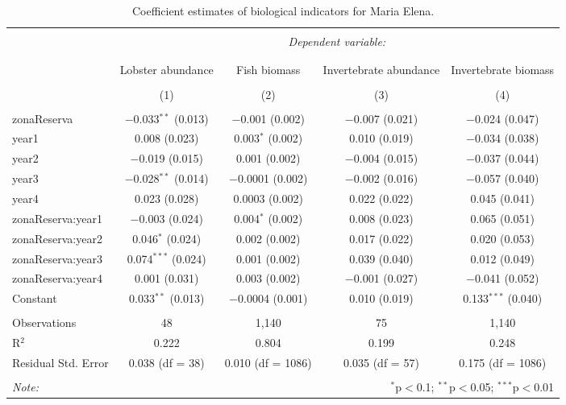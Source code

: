 \documentclass[utf8]{frontiers_suppmat} %
\theoremstyle{definition}
\theoremstyle{definition}
\theoremstyle{definition}
\theoremstyle{remark}
\begin{document}
\begin{table}[!htbp] \centering 
  \caption{Coefficient estimates of biological indicators for Maria Elena.} 
  \label{} 
\tiny 
\begin{tabular}{@{\extracolsep{1pt}}lcccc} 
\\[-1.8ex]\hline 
\hline \\[-1.8ex] 
 & \multicolumn{4}{c}{\textit{Dependent variable:}} \\ 
\cline{2-5} 
\\[-1.8ex] & \multicolumn{4}{c}{} \\ 
 & Lobster abundance & Fish biomass & Invertebrate abundance & Invertebrate biomass \\ 
\\[-1.8ex] & (1) & (2) & (3) & (4)\\ 
\hline \\[-1.8ex] 
 zonaReserva & $-$0.033$^{**}$ (0.013) & $-$0.001 (0.002) & $-$0.007 (0.021) & $-$0.024 (0.047) \\ 
  year1 & 0.008 (0.023) & 0.003$^{*}$ (0.002) & 0.010 (0.019) & $-$0.034 (0.038) \\ 
  year2 & $-$0.019 (0.015) & 0.001 (0.002) & $-$0.004 (0.015) & $-$0.037 (0.044) \\ 
  year3 & $-$0.028$^{**}$ (0.014) & $-$0.0001 (0.002) & $-$0.002 (0.016) & $-$0.057 (0.040) \\ 
  year4 & 0.023 (0.028) & 0.0003 (0.002) & 0.022 (0.022) & 0.045 (0.041) \\ 
  zonaReserva:year1 & $-$0.003 (0.024) & 0.004$^{*}$ (0.002) & 0.008 (0.023) & 0.065 (0.051) \\ 
  zonaReserva:year2 & 0.046$^{*}$ (0.024) & 0.002 (0.002) & 0.017 (0.022) & 0.020 (0.053) \\ 
  zonaReserva:year3 & 0.074$^{***}$ (0.024) & 0.001 (0.002) & 0.039 (0.040) & 0.012 (0.049) \\ 
  zonaReserva:year4 & 0.001 (0.031) & 0.003 (0.002) & $-$0.001 (0.027) & $-$0.041 (0.052) \\ 
  Constant & 0.033$^{**}$ (0.013) & $-$0.0004 (0.001) & 0.010 (0.019) & 0.133$^{***}$ (0.040) \\ 
 \hline \\[-1.8ex] 
Observations & 48 & 1,140 & 75 & 1,140 \\ 
R$^{2}$ & 0.222 & 0.804 & 0.199 & 0.248 \\ 
Residual Std. Error & 0.038 (df = 38) & 0.010 (df = 1086) & 0.035 (df = 57) & 0.175 (df = 1086) \\ 
\hline 
\hline \\[-1.8ex] 
\textit{Note:}  & \multicolumn{4}{r}{$^{*}$p$<$0.1; $^{**}$p$<$0.05; $^{***}$p$<$0.01} \\ 
\end{tabular} 
\end{table}
\end{document}
